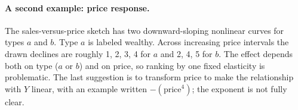 \paragraph{A second example: price response.}
The sales-versus-price sketch has two downward-sloping nonlinear curves for types $a$ and $b$. Type $a$ is labeled wealthy. Across increasing price intervals the drawn declines are roughly 1, 2, 3, 4 for $a$ and 2, 4, 5 for $b$. The effect depends both on type ($a$ or $b$) and on price, so ranking by one fixed elasticity is problematic. The last suggestion is to transform price to make the relationship with $Y$ linear, with an example written $-(\mathrm{price}^{4})$; the exponent is not fully clear.
